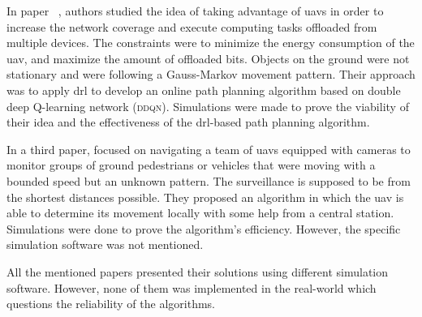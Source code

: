 \documentclass[../main.tex]{subfiles}
\begin{document}
		
		In paper ~\cite{pen21}, authors \citeauthor{pen21} studied the idea of taking advantage of \glspl{uav} in order to increase the network coverage and execute computing tasks offloaded from multiple devices. 
		The constraints were to minimize the energy consumption of the \gls{uav}, and maximize the amount of offloaded bits. 
		Objects on the ground were not stationary and were following a Gauss-Markov movement pattern. Their approach was to apply \gls{drl} to develop an online path planning algorithm based on double deep Q-learning network (\textsc{ddqn}).
		Simulations were made to prove the viability of their idea and the effectiveness of the \gls{drl}-based path planning algorithm.
		
		In a third paper, \citeauthor{hua21} focused on navigating a team of \glspl{uav} equipped with cameras to monitor groups of ground pedestrians or vehicles that were moving with a bounded speed but an unknown pattern. 
		The surveillance is supposed to be from the shortest distances possible. 
		They proposed an algorithm in which the \gls{uav} is able to determine its movement locally with some help from a central station.
		Simulations were done to prove the algorithm's efficiency. However, the specific simulation software was not mentioned. 
		
		All the mentioned papers presented their solutions using different simulation software. However, none of them was implemented in the real-world which questions the reliability of the algorithms.




\blindtext
\end{document}
